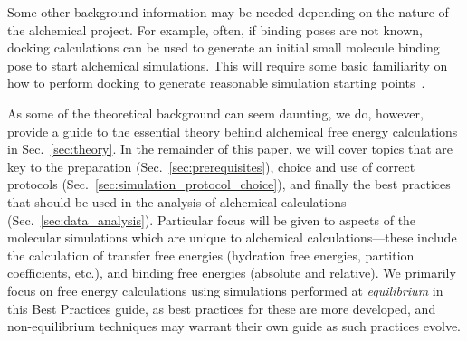 \documentclass[9pt,bestpractices,pubversion]{livecoms}
\begin{document}
Some other background information may be needed depending on the nature of the alchemical project. For example, often, if binding poses are not known, docking calculations can be used to generate an initial small molecule binding pose to start alchemical simulations. This will require some basic familiarity on how to perform docking to generate reasonable simulation starting points~\cite{grinter2014challenges}. 

As some of the theoretical background can seem daunting, we do, however, provide a guide to the essential theory behind alchemical free energy calculations in Sec.~\ref{sec:theory}.
In the remainder of this paper, we will cover topics that are key to the preparation (Sec.~\ref{sec:prerequisites}), choice and use of correct protocols (Sec.~\ref{sec:simulation_protocol_choice}), and finally the best practices that should be used in the analysis of alchemical calculations (Sec.~\ref{sec:data_analysis}). 
Particular focus will be given to aspects of the molecular simulations which are unique to alchemical calculations---these include the calculation of transfer free energies (hydration free energies, partition coefficients, etc.), and binding free energies (absolute and relative). We primarily focus on free energy calculations using simulations performed at \emph{equilibrium} in this Best Practices guide, as best practices for these are more developed, and non-equilibrium techniques may warrant their own guide as such practices evolve. 
\end{document}
